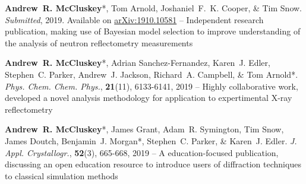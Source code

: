 \begin{cventriesy}
  \cventryy
    {
      \begin{cvitemsy}
        \item {\textbf{Andrew~R. McCluskey}*, Tom Arnold, Joshaniel~F.~K. Cooper, \& Tim Snow. \emph{Submitted}, 2019. Available on \href{https://arxiv.org/abs/1910.10581}{arXiv:1910.10581} -- Independent research publication, making use of Bayesian model selection to improve understanding of the analysis of neutron reflectometry measurements}
    \vspace{1mm}
        \item {\textbf{Andrew~R. McCluskey}*, Adrian Sanchez-Fernandez, Karen~J. Edler, Stephen~C. Parker, Andrew~J. Jackson, Richard~A. Campbell, \& Tom Arnold*. \emph{Phys. Chem. Chem. Phys.}, \textbf{21}(11), 6133-6141, 2019 -- Highly collaborative work, developed a novel analysis methodology for application to expertimental X-ray reflectometry}
    \vspace{1mm}
        \item {\textbf{Andrew~R. McCluskey}*, James Grant, Adam~R. Symington, Tim Snow, James Doutch, Benjamin~J. Morgan*, Stephen~C. Parker, \& Karen~J. Edler. \emph{J. Appl. Crystallogr.}, \textbf{52}(3), 665-668, 2019 -- A education-focused publication, discussing an open education resource to introduce users of diffraction techniques to classical simulation methods} 
      \end{cvitemsy}
    }
\end{cventriesy}